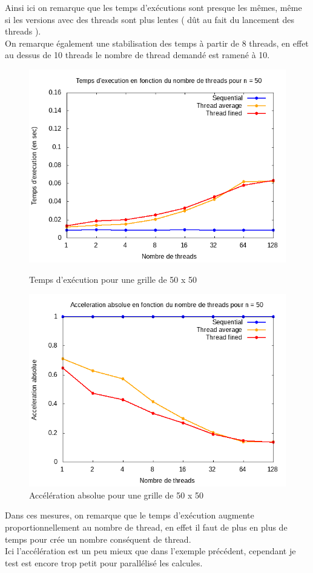 \documentclass[10pt,a4paper]{article}
\begin{document}
Ainsi ici on remarque que les temps d'exécutions sont presque les mêmes, même si les versions avec des threads sont plus lentes ( dût au fait du lancement des threads ).\\
On remarque également une stabilisation des temps à partir de 8 threads, en effet au dessus de 10 threads le nombre de thread demandé est ramené à 10.
\begin{figure}[h]
  \centering
  \begin{minipage}[b]{0.49\textwidth}
	\includegraphics[width=\textwidth]{./Time/size_50_time.png}
    \caption{Temps d'exécution pour une grille de 50 x 50}
  \end{minipage}
  \hfill
  \begin{minipage}[b]{0.49\textwidth}
    \includegraphics[width=\textwidth]{./Time/size_50_acceleration.png}
    \caption{Accélération absolue pour une grille de 50 x 50}
  \end{minipage}
\end{figure}
Dans ces mesures, on remarque que le temps d'exécution augmente proportionnellement au nombre de thread, en effet il faut de plus en plus de temps pour crée un nombre conséquent de thread.\\
Ici l'accélération est un peu mieux que dans l'exemple précédent, cependant je test est encore trop petit pour parallélisé les calcules.\\
\end{document}
